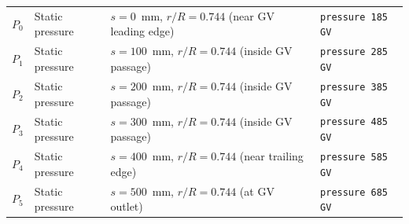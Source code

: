 \begin{table}[H]
\begin{tabular}{llll}
$P_0$ & Static pressure & $s = 0$~mm,   $r/R = 0.744$ (near GV leading edge) & \verb|pressure 185 GV| \\
$P_1$ & Static pressure & $s = 100$~mm, $r/R = 0.744$ (inside GV passage)    & \verb|pressure 285 GV| \\
$P_2$ & Static pressure & $s = 200$~mm, $r/R = 0.744$ (inside GV passage)    & \verb|pressure 385 GV| \\
$P_3$ & Static pressure & $s = 300$~mm, $r/R = 0.744$ (inside GV passage)    & \verb|pressure 485 GV| \\
$P_4$ & Static pressure & $s = 400$~mm, $r/R = 0.744$ (near trailing edge)   & \verb|pressure 585 GV| \\
$P_5$ & Static pressure & $s = 500$~mm, $r/R = 0.744$ (at GV outlet)         & \verb|pressure 685 GV| \\ \hline
\end{tabular}
\end{table}

